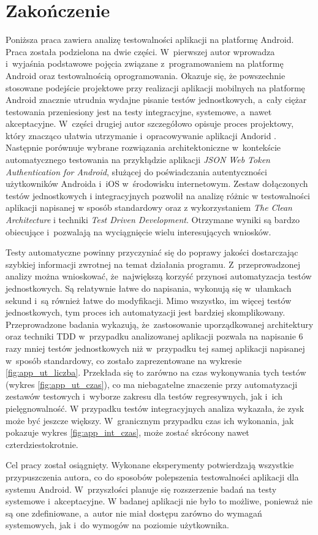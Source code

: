\chapter*{Zakończenie}
\label{zakonczenie}

Poniższa praca zawiera analizę testowalności aplikacji na platformę Android. Praca została podzielona na dwie części. W~pierwszej autor wprowadza i~wyjaśnia podstawowe pojęcia związane z~programowaniem na platformę Android oraz testowalnością oprogramowania. Okazuje się, że powszechnie stosowane podejście projektowe przy realizacji aplikacji mobilnych na platformę Android znacznie utrudnia wydajne pisanie testów jednostkowych, a~cały ciężar testowania przeniesiony jest na testy integracyjne, systemowe, a~nawet akceptacyjne. W~części drugiej autor szczegółowo opisuje proces projektowy, który znacząco ułatwia utrzymanie i~opracowywanie aplikacji Andorid \cite{website:cecil:blog}. Następnie porównuje wybrane rozwiązania architektoniczne w~kontekście automatycznego testowania na przykłądzie aplikacji \textit{JSON Web Token Authentication for Android}, służącej do poświadczania autentyczności użytkowników
Androida i~iOS w~środowisku internetowym. Zestaw dołączonych testów jednostkowych i integracyjnych pozwolił na analizę różnic w testowalności aplikacji napisanej w sposób standardowy oraz z wykorzystaniem \textit{The Clean Architecture} i techniki \textit{Test Driven Development}. Otrzymane wyniki są bardzo obiecujące i~pozwalają na wyciągnięcie wielu interesujących wniosków.

Testy automatyczne powinny przyczyniać się do poprawy jakości dostarczając szybkiej informacji zwrotnej na temat działania programu. Z~przeprowadzonej analizy można wnioskować, że~największą korzyść przynosi automatyzacja testów jednostkowych. Są relatywnie łatwe do napisania, wykonują się w~ułamkach sekund i~są również łatwe do modyfikacji. Mimo wszystko, im więcej testów jednostkowych, tym proces ich automatyzacji jest bardziej skomplikowany. Przeprowadzone badania wykazują, że~zastosowanie uporządkowanej architektury oraz techniki TDD w~przypadku analizowanej aplikacji pozwala na napisanie 6 razy mniej testów jednostkowych niż w~przypadku tej samej aplikacji napisanej w~sposób standardowy, co zostało zaprezentowane na wykresie \ref{fig:app_ut_liczba}. Przekłada się to zarówno na czas wykonywania tych testów (wykres \ref{fig:app_ut_czas}), co ma niebagatelne znaczenie przy automatyzacji zestawów testowych i~wyborze zakresu dla testów regresywnych, jak i~ich pielęgnowalność.  W przypadku testów integracyjnych analiza wykazała, że zysk może być jeszcze większy. W~granicznym przypadku czas ich wykonania, jak pokazuje wykres \ref{fig:app_int_czas}, może zostać skrócony nawet czterdziestokrotnie.

Cel pracy został osiągnięty. Wykonane eksperymenty potwierdzają wszystkie przypuszczenia autora, co do sposobów polepszenia testowalności aplikacji dla systemu Android. W~przyszłości planuje się rozszerzenie badań na testy systemowe i~akceptacyjne. W badanej aplikacji nie było to możliwe, ponieważ nie są one zdefiniowane, a~autor nie miał dostępu zarówno do wymagań systemowych, jak i~do wymogów na poziomie użytkownika. 


